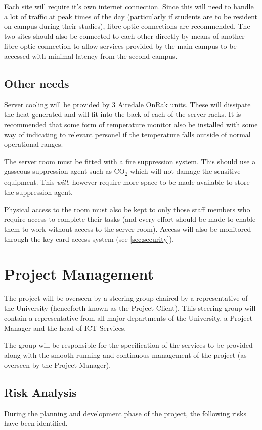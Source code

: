 \documentclass[a4paper, twoside]{article}
\begin{document}
Each site will require it's own internet connection. Since this will need to
handle a lot of traffic at peak times of the day (particularly if students are
to be resident on campus during their studies), fibre optic connections are
recommended. The two sites should also be connected to each other directly by
means of another fibre optic connection to allow services provided by the main
campus to be accessed with minimal latency from the second campus.

\subsection{Other needs}
Server cooling will be provided by 3 Airedale OnRak units. These will dissipate
the heat generated and will fit into the back of each of the server racks. It is
recommended that some form of temperature monitor also be installed with some
way of indicating to relevant personel if the temperature falls outside of
normal operational ranges.

The server room must be fitted with a fire suppression system. This should use a
gasseous suppression agent such as CO\textsubscript{2} which will not damage the
sensitive equipment. This \emph{will}, however require more space to be made
available to store the suppression agent.

Physical access to the room must also be kept to only those staff members who
require access to complete their tasks (and every effort should be made to
enable them to work without access to the server room). Access will also be
monitored through the key card access system (see \ref{sec:security}).

\section{Project Management}
\label{sec:projman}
The project will be overseen by a steering group chaired by a representative of
the University (henceforth known as the Project Client). This steering group
will contain a representative from all major departments of the University, a
Project Manager and the head of ICT Services.

The group will be responsible for the specification of the services to be
provided along with the smooth running and continuous management of the project
(as overseen by the Project Manager).

\subsection{Risk Analysis}
During the planning and development phase of the project, the following risks
have been identified.
\end{document}
